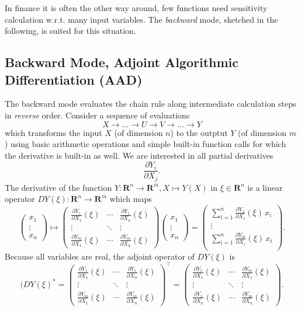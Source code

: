 \documentclass[12pt, a4paper]{report}
\def\R{{\boldsymbol{R}}}
\begin{document}
In finance it is often the other way around, few
functions need sensitivity calculation w.r.t. many input variables. 
The {\em backward} mode, sketched in the following, is 
suited for this situation.

\subsection*{Backward Mode, Adjoint Algorithmic Differentiation (AAD)}
The backward mode evaluates the chain rule along
intermediate calculation steps in {\em reverse} order.
Consider a sequence of evaluations \cite{capriotti_2011c}
$$
X \rightarrow ... \rightarrow U \rightarrow V \rightarrow
... \rightarrow Y
$$  
which transforms the input $X$ (of dimension $n$) to the outptut $Y$
(of dimension $m$) using basic arithmetic operations and simple
built-in function calls for which the derivative is built-in as well. 
We are interested in all partial derivatives
$$
\frac{\partial Y_i}{\partial X_j}.
$$
The derivative of the function $Y: \R^n \to \R^m, X\mapsto Y(X)$ in $\xi\in\R^n$ is a linear operator $DY(\xi): \R^n\to\R^m$ which maps
$$
\left(\begin{matrix}
x_1\\ 
\vdots\\ 
x_n
\end{matrix}\right)
 \mapsto 
\left( \begin{matrix}
\frac{\partial Y_1}{\partial X_1}(\xi) & \cdots & \frac{\partial Y_1}{\partial X_n}(\xi)\\
\vdots & \ddots & \vdots\\
\frac{\partial Y_m}{\partial X_1}(\xi) & \cdots & \frac{\partial Y_m}{\partial X_n}(\xi)
\end{matrix}\right) \!
\left(\begin{matrix}
x_1\\ 
\vdots\\ 
x_n
\end{matrix}\right)
= \left(\begin{matrix}
\sum_{i=1}^n \frac{\partial Y_1}{\partial X_i}(\xi)\,x_i\\ 
\vdots\\ 
\sum_{i=1}^n \frac{\partial Y_m}{\partial X_i}(\xi)\,x_i\\ 
\end{matrix}\right) \!.$$
Because all variables are real, the adjoint operator of $DY(\xi)$ is
$$(DY(\xi)^* = \left( \begin{matrix}
\frac{\partial Y_1}{\partial X_1}(\xi) & \cdots & \frac{\partial Y_1}{\partial X_n}(\xi)\\
\vdots & \ddots & \vdots\\
\frac{\partial Y_m}{\partial X_1}(\xi) & \cdots & \frac{\partial Y_m}{\partial X_n}(\xi)
\end{matrix}\right)^{\top} \!= 
\left( \begin{matrix}
\frac{\partial Y_1}{\partial X_1}(\xi) & \cdots & \frac{\partial Y_m}{\partial X_1}(\xi)\\
\vdots & \ddots & \vdots\\
\frac{\partial Y_1}{\partial X_n}(\xi) & \cdots & \frac{\partial Y_m}{\partial X_n}(\xi)
\end{matrix}\right).
$$
\end{document}
